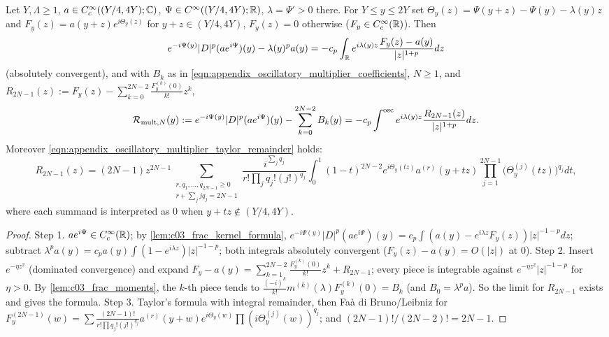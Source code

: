 \begin{lemma}
  \label{lem:c03_mult_expansion}
  Let $Y,\Lambda\ge1$, $a\in C_c^\infty((Y/4,4Y);\mathbb{C})$, $\Psi\in C^\infty((Y/4,4Y);\mathbb{R})$, $\lambda=\Psi'>0$ there. For $Y\le y\le2Y$ set $\Theta_y(z)=\Psi(y+z)-\Psi(y)-\lambda(y)z$ and $F_y(z)=a(y+z)e^{i\Theta_y(z)}$ for $y+z\in(Y/4,4Y)$, $F_y(z)=0$ otherwise ($F_y\in C_c^\infty(\mathbb{R})$). Then
  \begin{equation}\label{eqn:appendix_oscillatory_multiplier_kernel}
    e^{-i\Psi(y)}|D|^p(ae^{i\Psi})(y)-\lambda(y)^pa(y)=-c_p\int_{\mathbb{R}} e^{i\lambda(y)z}\frac{F_y(z)-a(y)}{|z|^{1+p}}dz
  \end{equation}
  (absolutely convergent), and with $B_k$ as in \eqref{eqn:appendix_oscillatory_multiplier_coefficients}, $N\ge1$, and
  $R_{2N-1}(z):=F_y(z)-\sum_{k=0}^{2N-2}\frac{F_y^{(k)}(0)}{k!}z^k$,
  \[
    \mathcal{R}_{\textup{mult},N}(y):=e^{-i\Psi(y)}|D|^p(ae^{i\Psi})(y)-\sum_{k=0}^{2N-2}B_k(y)=-c_p\int^{\textup{osc}}e^{i\lambda(y)z}\frac{R_{2N-1}(z)}{|z|^{1+p}}dz .
  \]
  Moreover \eqref{eqn:appendix_oscillatory_multiplier_taylor_remainder} holds:
  \begin{equation}\label{eqn:appendix_oscillatory_multiplier_taylor_remainder}
    R_{2N-1}(z)=(2N-1)z^{2N-1}\!\!\sum_{\substack{r,q_1,\dots,q_{2N-1}\ge0\\ r+\sum_jjq_j=2N-1}}\!\!\frac{i^{\sum_jq_j}}{r!\prod_jq_j!(j!)^{q_j}}\int_0^1(1-t)^{2N-2}e^{i\Theta_y(tz)}a^{(r)}(y+tz)\prod_{j=1}^{2N-1}\bigl(\Theta_y^{(j)}(tz)\bigr)^{q_j}dt,
  \end{equation}
  where each summand is interpreted as $0$ when $y+tz\notin(Y/4,4Y)$.
\end{lemma}
\begin{proof}
  Step 1. $ae^{i\Psi}\in C_c^\infty(\mathbb{R})$; by \cref{lem:c03_frac_kernel_formula}, $e^{-i\Psi(y)}|D|^p(ae^{i\Psi})(y)=c_p\int(a(y)-e^{i\lambda z}F_y(z))|z|^{-1-p}dz$; subtract $\lambda^pa(y)=c_pa(y)\int(1-e^{i\lambda z})|z|^{-1-p}$; both integrals absolutely convergent ($F_y(z)-a(y)=O(|z|)$ at $0$).
  Step 2. Insert $e^{-\eta z^2}$ (dominated convergence) and expand $F_y-a(y)=\sum_{k=1}^{2N-2}\frac{F_y^{(k)}(0)}{k!}z^k+R_{2N-1}$; every piece is integrable against $e^{-\eta z^2}|z|^{-1-p}$ for $\eta>0$. By \cref{lem:c03_frac_moments}, the $k$-th piece tends to $\frac{(-i)^k}{k!}m^{(k)}(\lambda)F_y^{(k)}(0)=B_k$ (and $B_0=\lambda^pa$). So the limit for $R_{2N-1}$ exists and gives the formula.
  Step 3. Taylor's formula with integral remainder, then Fa\`a di Bruno/Leibniz for $F_y^{(2N-1)}(w)=\sum\frac{(2N-1)!}{r!\prod q_j!(j!)^{q_j}}a^{(r)}(y+w)e^{i\Theta_y(w)}\prod(i\Theta_y^{(j)}(w))^{q_j}$; and $(2N-1)!/(2N-2)!=2N-1$.
\end{proof}

